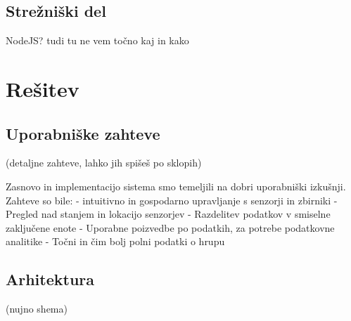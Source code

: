 \documentclass[a4paper, 12pt]{book}
\begin{document}
\section{Strežniški del}

NodeJS? tudi tu ne vem točno kaj in kako 

\chapter{Rešitev}
\section{Uporabniške zahteve}
(detaljne zahteve, lahko jih spišeš po sklopih)

Zasnovo in implementacijo sistema smo temeljili na dobri uporabniški izkušnji. Zahteve so bile:
- intuitivno in gospodarno upravljanje s senzorji in zbirniki
- Pregled nad stanjem in lokacijo senzorjev
- Razdelitev podatkov v smiselne zaključene enote
- Uporabne poizvedbe po podatkih, za potrebe podatkovne analitike
- Točni in čim bolj polni podatki o hrupu 


\section{Arhitektura}
(nujno shema)
\end{document}
